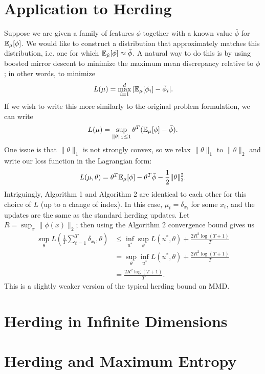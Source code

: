 \documentclass{article}
\begin{document}
\section{Application to Herding}
\label{sec:herding}
Suppose we are given a family of features $\phi$ together 
with a known value $\bar{\phi}$ for $\mathbb{E}_{\mu}[\phi]$. We 
would like to construct a distribution that approximately 
matches this distribution, i.e. one for which 
$\mathbb{E}_{\hat{\mu}}[\phi] \approx \bar{\phi}$. A natural way 
to do this is by using boosted mirror descent to minimize the 
maximum mean discrepancy relative to $\phi$; 
in other words, to minimize
\[ L(\mu) = \max\limits_{i=1}^d |\mathbb{E}_{\mu}[\phi_i]-\bar{\phi}_i|. \]
If we wish to write this more similarly to the original problem 
formulation, we can write
\[ L(\mu) = \sup_{\|\theta\|_1 \leq 1} \theta^T(\mathbb{E}_{\mu}[\phi]-\bar{\phi}). \]
One issue is that $\|\theta\|_1$ is not strongly convex, so we relax $\|\theta\|_1$ 
to $\|\theta\|_2$ and write our loss function in the Lagrangian form:
\[ L(\mu, \theta) = \theta^T\mathbb{E}_{\mu}[\phi] - \theta^T\bar{\phi} - \frac{1}{2}\|\theta\|_2^2. \]
Intriguingly, Algorithm 1 and Algorithm 2 are identical to each other for this choice of $L$ 
(up to a change of index). In this case, $\mu_t = \delta_{x_t}$ for some $x_t$, and 
the updates are the same as the standard herding updates. Let $R = \sup_{x} \|\phi(x)\|_2$; 
then using the Algorithm 2 convergence bound gives us
\begin{align*}
\sup_{\theta} L\left(\frac{1}{T} \sum_{t=1}^T \delta_{x_t}, \theta\right) &\leq \inf_{u^*} \sup_{\theta} L(u^*, \theta) + \frac{2R^2\log(T+1)}{T} \\
 &= \sup_{\theta} \inf_{u^*} L(u^*, \theta) + \frac{2R^2\log(T+1)}{T} \\
 &= \frac{2R^2\log(T+1)}{T}.
\end{align*}
This is a slightly weaker version of the typical herding bound on MMD.

\section{Herding in Infinite Dimensions}
\label{sec:infinite-case}

\section{Herding and Maximum Entropy}
\label{sec:max-ent}
\end{document}
